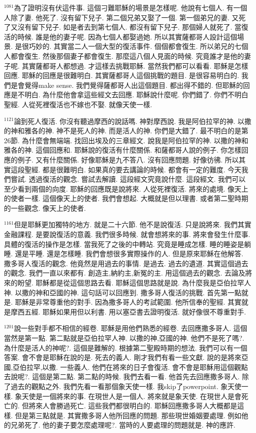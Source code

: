 \documentclass{book}
\begin{document}
$^{1081}$為了證明沒有伏這件事.
這個刁難耶穌的場景是怎樣呢.
他說有七個人.
有一個人除了妻.
他死了.
沒有留下兒子.
第二個兄弟又娶了一個.
第一個弟兄的妻.
又死了又沒有留下兒子.
如是者去到第七個人.
都沒有留下兒子.
那個婦人就死了.
當復活的時候.
誰是他的妻子呢.
因為七個人都娶過她.
所以其實薩都哥人設計這個場景.
是很巧妙的.
其實當二人一個大型的復活事件.
個個都會復生.
所以弟兄的七個人都會復生.
然後那個妻子都會復生.
那麼這八個人見面的時候.
究竟誰才是他的妻子呢.
其實薩都哥人都想過.
才這樣去挑戰耶穌.
當然我們都可以看看.
耶穌是怎樣回應.
耶穌的回應是很難明白.
其實薩都哥人這個挑戰的題目.
是很容易明白的.
我們是會覺得make sense.
我們覺得薩都哥人出這個題目.
都出得不錯的.
但耶穌的回應是不明白.
為什麼他會拿這些經文去回應.
耶穌說什麼呢.
你們錯了.
你們不明白聖經.
人從死裡復活也不嫁也不娶.
就像天使一樣.

$^{1121}$論到死人復活.
你沒有聽過摩西的說話嗎.
神對摩西說.
我是阿伯拉罕的神.
以撒的神和雅各的神.
神不是死人的神.
而是活人的神.
你們是大錯了.
最不明白的是第26節.
為什麼會無端端.
找回出埃及的三章經文.
說我是阿伯拉罕的神.
以撒的神和雅各的神.
這個回應和.
耶穌說的復活有什麼關係.
和薩都哥人說的例子.
你怎樣回應的例子.
又有什麼關係.
好像耶穌是九不答八.
沒有回應問題.
好像彷彿.
所以其實這段聖經.
都是很難明白.
如果真的要去講論的時候.
都會有一定的難度.
今天我們嘗試.
透過復活的觀念.
嘗試去解讀.
這段經文究竟說什麼.
這段經文.
我們可以至少看到兩個的向度.
耶穌的回應既是說將來.
人從死裡復活.
將來的處境.
像天上的使者一樣.
這個像天上的使者.
我們會想起.
大概就是但以理書.
或者第二聖時期的一些觀念.
像天上的使者.

$^{1161}$但是耶穌更加獨特的地方.
就是二十六節.
他不是說復活.
只是說將來.
我們其實金融課程.
是要說復活的意義.
我們很多時候.
就會想將來的事.
將來會發生什麼事.
具體的復活的操作是怎樣.
當我死了之後的中轉站.
究竟是睡成怎樣.
睡的睡姿是躺睡.
還是平睡.
還是怎樣睡.
我們會想很多實際操作的人.
但是原來耶穌在他解答.
撒多哥人復活的觀念.
他竟然是用過去的事情.
是過去.
過去的遺道.
其實這個過去的觀念.
我們一直以來都有.
創造主,納約主,新冤的主.
用這個過去的觀念.
去論及將來的盼望.
耶穌都是從這個思路去看.
耶穌這個思路就是說.
為什麼我是亞伯拉罕人神.
以撒的神和亞國的神.
這句話可以回應到.
撒多哥人復活的挑戰.
首先第一點就是.
耶穌是非常尊重他的對手.
因為撒多哥人的考試範圍.
他所信奉的聖經.
其實就是摩西五經.
耶穌如果用但以利書.
用以塞亞書去證明復活.
就好像很不尊重對手.

$^{1201}$說一些對手都不相信的經卷.
耶穌是用他們熟悉的經卷.
去回應撒多哥人.
這個當然是第一點.
第二點就是亞伯拉罕人神.
以撒的神,亞國的神.
他們不是死了嗎?.
為什麼是活人的神呢?.
這個是難解的.
根據第二聖殿時期的想法.
我們可以有一個答案.
會不會是耶穌在說的是.
死去的義人.
剛才我們有看一些文獻.
說的是將來亞國,亞伯拉罕,以撒.
一些義人.
他們在將來的日子會復活.
會不會是耶穌用這個觀點去說呢?.
這個是第二點.
第二點的時候.
我們去看一看.
他首先去回應撒多哥人.
除了過去的觀點之外.
我們先看一看那個象天使一樣.
我skip了powerpoint.
象天使一樣.
象天使是一個將來的事.
在現世人是一個人.
將來就是象天使.
在現世人是會死亡的.
但將來人會勝過死亡.
這些我們都很明白的.
耶穌回應撒多哥人大概都是這樣.
但是第三點就是.
其實撒多哥人他所回應的問題.
那些現世婚姻要處理.
例如他的兄弟死了.
他的妻子要怎麼處理呢?.
當時的人要處理的問題就是.
神的應許.
\end{document}
